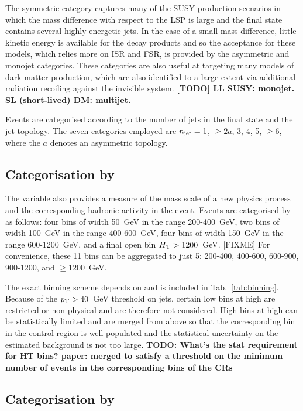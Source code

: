 The symmetric category captures many of the SUSY production scenarios in which 
the mass difference with respect to the LSP is large and the final state 
contains several highly energetic jets. In the case of a small mass difference, 
little kinetic energy is available for the decay products and so the acceptance 
for these models, which relies more on ISR and FSR, is provided by the 
asymmetric and monojet categories. These categories are also useful at 
targeting many models of dark matter production, which are also identified to a 
large extent via additional radiation recoiling against the invisible system.
\textbf{[TODO] LL SUSY: monojet. SL (short-lived) DM: multijet.}

Events are categorised according to the number of jets in the final state and 
the jet topology. The seven categories employed are $n_{\text{jet}} = 1$, $\geq2a$, 3, 
4, 5, $\geq6$, where the $a$ denotes an asymmetric topology.

\subsection*{Categorisation by \scalht}

The \scalht variable also provides a measure of the mass scale of a new physics 
process  and the corresponding hadronic activity in the event. Events are 
categorised by \scalht as follows: four bins of width 50~GeV in the range 
200-400~GeV, two bins of width 100~GeV in the range 400-600~GeV, four bins of 
width 150~GeV in the range 600-1200~GeV, and a final open bin 
$\mbox{$H_\text{T}$}>1200$~GeV. 
[FIXME] For convenience, %
these 11 bins can be aggregated to just 5: 200-400, 400-600, 600-900, 900-1200, 
and $\geq1200$~GeV.

The exact \scalht binning scheme depends on \njet and is included in 
Tab.~\ref{tab:binning}. Because of the ${p_{\text T}}>40$~GeV threshold on jets, certain 
low \scalht bins at high \njet are restricted or non-physical and are therefore 
not considered. High \scalht bins at high \njet can be statistically limited 
and are merged from above so that the corresponding bin in the control region 
is well populated and the statistical uncertainty on the estimated background  
is not too large.
\textbf{TODO: What's the stat requirement for HT bins? paper: merged to satisfy 
a threshold on the minimum number of events in the corresponding bins of the 
CRs} 

\subsection*{Categorisation by \nb}

